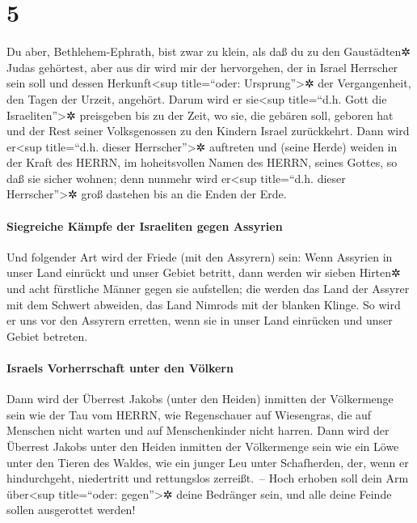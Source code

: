 \hypertarget{section-4}{%
\section{5}\label{section-4}}

Du aber, Bethlehem-Ephrath, bist zwar zu klein, als daß du
zu den Gaustädten✲ Judas gehörtest, aber aus dir wird mir der
hervorgehen, der in Israel Herrscher sein soll und dessen
Herkunft\textless sup title=``oder: Ursprung''\textgreater✲ der
Vergangenheit, den Tagen der Urzeit, angehört. Darum wird
er sie\textless sup title=``d.h. Gott die Israeliten''\textgreater✲
preisgeben bis zu der Zeit, wo sie, die gebären soll, geboren hat und
der Rest seiner Volksgenossen zu den Kindern Israel zurückkehrt.
Dann wird er\textless sup title=``d.h. dieser
Herrscher''\textgreater✲ auftreten und (seine Herde) weiden in der Kraft
des HERRN, im hoheitsvollen Namen des HERRN, seines Gottes, so daß sie
sicher wohnen; denn nunmehr wird er\textless sup title=``d.h. dieser
Herrscher''\textgreater✲ groß dastehen bis an die Enden der Erde.

\hypertarget{siegreiche-kuxe4mpfe-der-israeliten-gegen-assyrien}{%
\paragraph{Siegreiche Kämpfe der Israeliten gegen
Assyrien}\label{siegreiche-kuxe4mpfe-der-israeliten-gegen-assyrien}}

Und folgender Art wird der Friede (mit den Assyrern) sein:
Wenn Assyrien in unser Land einrückt und unser Gebiet betritt, dann
werden wir sieben Hirten✲ und acht fürstliche Männer gegen sie
aufstellen; die werden das Land der Assyrer mit dem
Schwert abweiden, das Land Nimrods mit der blanken Klinge. So wird er
uns vor den Assyrern erretten, wenn sie in unser Land einrücken und
unser Gebiet betreten.

\hypertarget{israels-vorherrschaft-unter-den-vuxf6lkern}{%
\paragraph{Israels Vorherrschaft unter den
Völkern}\label{israels-vorherrschaft-unter-den-vuxf6lkern}}

Dann wird der Überrest Jakobs (unter den Heiden) inmitten
der Völkermenge sein wie der Tau vom HERRN, wie Regenschauer auf
Wiesengras, die auf Menschen nicht warten und auf Menschenkinder nicht
harren. Dann wird der Überrest Jakobs unter den Heiden
inmitten der Völkermenge sein wie ein Löwe unter den Tieren des Waldes,
wie ein junger Leu unter Schafherden, der, wenn er hindurchgeht,
niedertritt und rettungslos zerreißt.~-- Hoch erhoben soll
dein Arm über\textless sup title=``oder: gegen''\textgreater✲ deine
Bedränger sein, und alle deine Feinde sollen ausgerottet werden!

